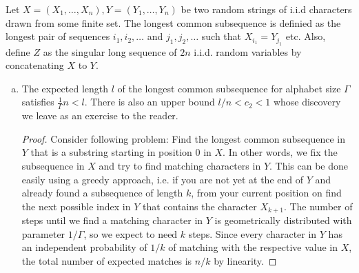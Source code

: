\begin{aufgabe}
Let $X=(X_1,\dots, X_n), Y=(Y_1,\dots,Y_n)$ be two random strings of i.i.d characters drawn from some finite set.
The longest common subsequence is definied as the longest pair of sequences $i_1,i_2,\dots$ and $j_1,j_2,\dots$ such that $X_{i_1}=Y_{j_1}$ etc.
Also, define $Z$ as the singular long sequence of $2n$ i.i.d. random variables by concatenating $X$ to $Y$.
\begin{enumerate}[(a)]
    \item The expected length $l$ of the longest common subsequence for alphabet size $\Gamma$ satisfies $\frac{1}{\Gamma}n < l$.
    There is also an upper bound $l/n < c_2 < 1$ whose discovery we leave as an exercise to the reader.
    \begin{proof}
        Consider following problem: Find the longest common subsequence in $Y$ that is a substring starting in position $0$ in $X$.
        In other words, we fix the subsequence in $X$ and try to find matching characters in $Y$.
        This can be done easily using a greedy approach, i.e. if you are not yet at the end of $Y$ and already found a subsequence of length $k$, from your current position on find the next possible index in $Y$ that contains the character $X_{k+1}$.
        The number of steps until we find a matching character in $Y$ is geometrically distributed with parameter $1/\Gamma$, so we expect to need $k$ steps.
        Since every character in $Y$ has an independent probability of $1/k$ of matching with the respective value in $X$, the total number of expected matches is $n/k$ by linearity.
        

\end{proof}
\end{enumerate}
\end{aufgabe}
